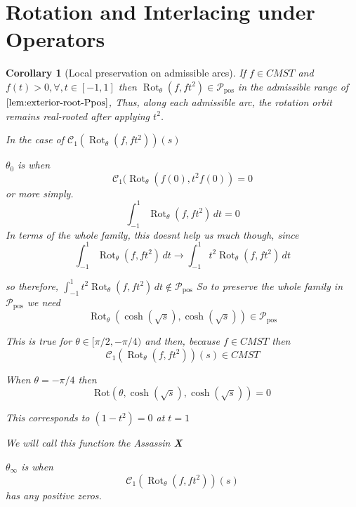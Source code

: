 \documentclass[11pt]{article}
\theoremstyle{breakdef}
\newtheorem{corollary}[theorem]{Corollary}
\newcommand{\Rot}{\operatorname{Rot}_{\theta}}
\newcommand{\Assassin}{\textbf{X}}
\begin{document}
\section{Rotation and Interlacing under Operators}
\begin{corollary}[Local preservation on admissible arcs]\label{cor:local-Ppos-arcs}
If $f \in CMST$ and $f(t) > 0, \forall, t \in [-1,1]$ 
then $\Rot({f},{f t^2}) \in \mathcal{P}_{\mathrm{pos}}$ in the admissible range of $\cref{lem:exterior-root-Ppos}$,
Thus, along each admissible arc, the rotation orbit remains real-rooted after applying $t^2$.

In the case of 
$\mathcal{C}_{1}(\Rot({f},{f t^2}))(s)$

$\theta_0$ is when 
\begin{equation}
\mathcal{C}_{1}(\Rot({f(0)},{t^2 f}(0)) = 0
\end{equation}
or more simply.
\begin{equation}
\int_{-1}^1 \Rot({f},{f t^2}) \, dt = 0 
\end{equation}
In terms of the whole family, this doesnt help us much though, since 
\begin{equation}
\int_{-1}^1 \Rot({f},{f t^2}) \, dt \to \int_{-1}^1 t^2 \Rot({f},{f t^2}) \, dt 
\end{equation}

so therefore, $\int_{-1}^1 t^2 \Rot({f},{f t^2}) \, dt \not \in \mathcal{P}_{\mathrm{pos}}$ 
So to preserve the whole family in $\mathcal{P}_{\mathrm{pos}}$ we need
\begin{equation}
\Rot\left(\cosh \left(\sqrt{s}\right),\cosh \left(\sqrt{s}\right)\right) \in \mathcal{P}_{\mathrm{pos}}
\end{equation}

This is true for $\theta \in [\pi/2, -\pi/4)$ and then, because $f \in CMST$ 
then 
\begin{equation}
\mathcal{C}_{1}(\Rot({f},{f t^2}))(s) \in CMST
\end{equation}


When $\theta = -\pi/4$ then 
\begin{equation}
\text{Rot}\left(\theta ,\cosh \left(\sqrt{s}\right),\cosh \left(\sqrt{s}\right)\right) = 0 
\end{equation}

This corresponds to $(1-t^2) = 0$ at $t = 1$


We will call this function the Assassin \Assassin

$\theta_{\infty}$ is when 
\begin{equation}
\mathcal{C}_{1}(\Rot({f},{f t^2}))(s) 
\end{equation}
has any positive zeros.


\end{corollary}
\end{document}
